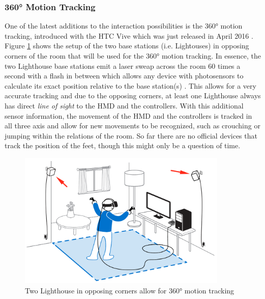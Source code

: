 \subsubsection{360° Motion Tracking}
\label{360MotionTracking}

One of the latest additions to the interaction possibilities is the 360° motion tracking, introduced with the HTC Vive which was just released in April 2016 \citep{Htcvive2016}. Figure \ref{fig:lighthouses} shows the setup of the two base stations (i.e. Lightouses) in opposing corners of the room that will be used for the 360° motion tracking. In essence, the two Lighthouse base stations emit a laser sweap across the room 60 times a second with a flash in between which allows any device with photosensors to calculate its exact position relative to the base station(s) \citep{Gizmodo2015}. This allows for a very accurate tracking and due to the opposing corners, at least one Lighthouse always has direct \textit{line of sight} to the HMD and the controllers. \newline
With this additional sensor information, the movement of the HMD and the controllers is tracked in all three axis and allow for new movements to be recognized, such as crouching or jumping within the relations of the room. \newline
So far there are no official devices that track the position of the feet, though this might only be a question of time.
\begin{figure}[h]
	\begin{center}
		\includegraphics[width=10cm]{03_Figures/05_LitReview/HTCCorp2016_LighthouseRoomScale.png}
		\caption[Two Lighthouse in opposing corners allow for 360° motion tracking]{Two Lighthouse in opposing corners allow for 360° motion tracking \citep{HTCCorp2016}}
		\label{fig:lighthouses}
	\end{center}
\end{figure}


